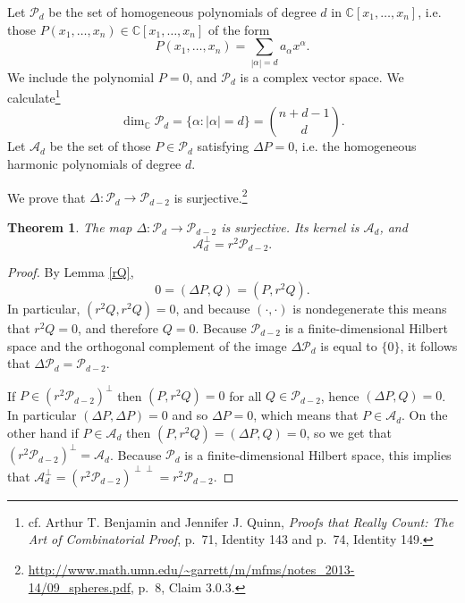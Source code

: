 \documentclass{article}
\newtheorem{theorem}{Theorem}
\theoremstyle{definition}
\begin{document}
Let $\mathscr{P}_d$ be  the set of homogeneous polynomials of degree $d$ in $\mathbb{C}[x_1,\ldots,x_n]$, 
i.e. those 
$P(x_1,\ldots,x_n) \in \mathbb{C}[x_1,\ldots,x_n]$
of the form
\[
P(x_1,\ldots,x_n) = \sum_{|\alpha|=d} a_\alpha x^\alpha.
\]
We include the polynomial $P=0$, and $\mathscr{P}_d$ is a complex vector space. We calculate\footnote{cf. Arthur T. Benjamin and Jennifer J. Quinn,
{\em Proofs that Really Count: The Art of Combinatorial Proof}, p.~71, Identity 143 and p.~74, Identity 149.}
\begin{equation}
\dim_\mathbb{C} \mathscr{P}_d = \{\alpha: |\alpha| = d\} = \binom{n+d-1}{d}.
\label{Pdimension}
\end{equation}
Let $\mathscr{A}_d$ be the set of those $P \in \mathscr{P}_d$ satisfying $\Delta P=0$, i.e. the homogeneous harmonic polynomials of degree $d$. 



We prove that $\Delta:\mathscr{P}_d \to \mathscr{P}_{d-2}$ is surjective.\footnote{\url{http://www.math.umn.edu/~garrett/m/mfms/notes_2013-14/09_spheres.pdf},
p.~8, Claim 3.0.3.}

\begin{theorem}
The map $\Delta:\mathscr{P}_d \to \mathscr{P}_{d-2}$ is surjective. Its kernel is
$\mathscr{A}_d$, and 
\[
\mathscr{A}_d^\perp = r^2 \mathscr{P}_{d-2}.
\]
\label{surjective}
\end{theorem}
\begin{proof}
By Lemma \ref{rQ},
\[
0=(\Delta P,Q) = (P,r^2Q).
\]
In particular, $(r^2Q,r^2Q)=0$, and because $(\cdot,\cdot)$ is nondegenerate this means that
$r^2Q=0$, and therefore $Q=0$. Because $\mathscr{P}_{d-2}$ is a finite-dimensional Hilbert space
and the orthogonal complement of the image $\Delta \mathscr{P}_d$ is equal to $\{0\}$, it follows
that $\Delta \mathscr{P}_d=\mathscr{P}_{d-2}$. 

If $P \in (r^2 \mathscr{P}_{d-2})^\perp$ then $(P,r^2Q)=0$ for all $Q \in \mathscr{P}_{d-2}$, hence
$(\Delta P,Q)=0$. In particular $(\Delta P,\Delta P)=0$ and so
$\Delta P=0$, which means that $P \in \mathscr{A}_d$.
 On the other hand if
 $P \in \mathscr{A}_d$ then 
$(P,r^2Q)=(\Delta P,Q)=0$, so we get that $(r^2 \mathscr{P}_{d-2})^\perp = \mathscr{A}_d$. 
Because $\mathscr{P}_d$ is a finite-dimensional Hilbert space, this implies that
$\mathscr{A}_d^\perp = (r^2 \mathscr{P}_{d-2})^{\perp \perp}=r^2 \mathscr{P}_{d-2}$. 
\end{proof}
\end{document}

